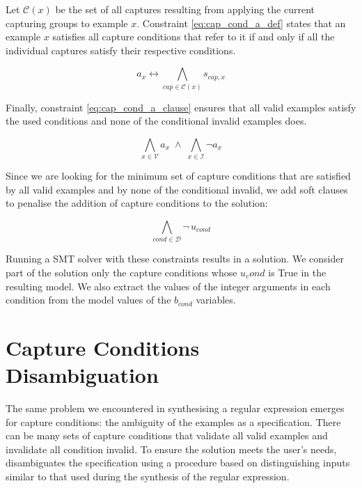 Let \(\mathcal{C}(x)\) be the set of all captures resulting from applying the current capturing groups to example \(x\). Constraint \ref{eq:cap_cond_a_def} states that an example \(x\) satisfies all capture conditions that refer to it if and only if all the individual captures satisfy their respective conditions.

\begin{equation}\label{eq:cap_cond_a_def}
    a_x \leftrightarrow \bigwedge_{cap \in \mathcal{C}(x)} s_{cap,x}
\end{equation}

Finally, constraint \ref{eq:cap_cond_a_clause} ensures that all valid examples satisfy the used conditions and none of the conditional invalid examples does.

\begin{equation}\label{eq:cap_cond_a_clause}
    \bigwedge_{x \in \mathcal{V}} a_x \;\land\; \bigwedge_{x \in \mathcal{I}} \neg a_x
\end{equation}


Since we are looking for the minimum set of capture conditions that are satisfied by all valid examples and by none of the conditional invalid, we add soft clauses to penalise the addition of capture conditions to the solution:

\begin{equation}
    \bigwedge_{cond \in \mathcal{D}} \neg\, u_{cond}
\end{equation}

Running a \ac{SMT} solver with these constraints results in a solution. We consider part of the solution only the capture conditions whose \(u_cond\) is True in the resulting model. We also extract the values of the integer arguments in each condition from the model values of the \(b_{\textit{cond}}\) variables.

\section{Capture Conditions Disambiguation}

The same problem we encountered in synthesising a regular expression emerges for capture conditions: the ambiguity of the examples as a specification. There can be many sets of capture conditions that validate all valid examples and invalidate all condition invalid. To ensure the solution meets the user's needs, \Forest disambiguates the specification using a procedure based on distinguishing inputs similar to that used during the synthesis of the regular expression.

